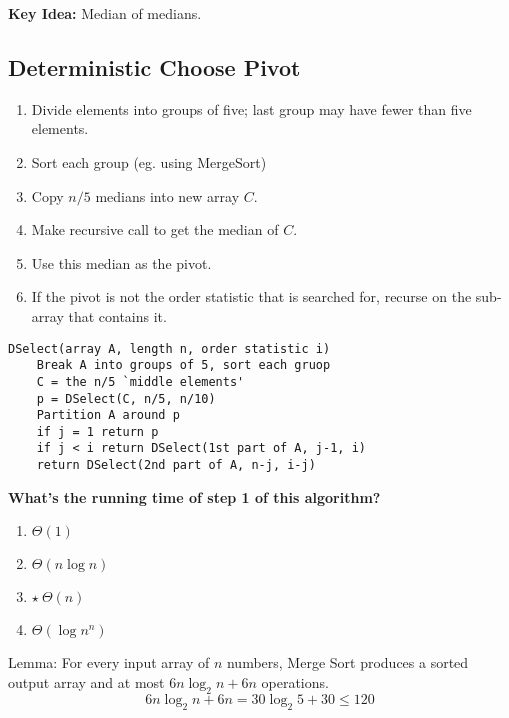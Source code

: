 \documentclass{article}
\begin{document}
\textbf{Key Idea:} Median of medians.

\subsection*{Deterministic Choose Pivot}
\begin{enumerate}
    \item Divide elements into groups of five; last group may have fewer than five elements.
    \item Sort each group (eg. using MergeSort)
    \item Copy \(n/5\) medians into new array $C$.
    \item Make recursive call to get the median of $C$.
    \item Use this median as the pivot.
    \item If the pivot is not the order statistic that is searched for, recurse on the sub-array that contains it.
\end{enumerate}

\begin{verbatim}
DSelect(array A, length n, order statistic i)
    Break A into groups of 5, sort each gruop
    C = the n/5 `middle elements'
    p = DSelect(C, n/5, n/10)
    Partition A around p
    if j = 1 return p
    if j < i return DSelect(1st part of A, j-1, i)
    return DSelect(2nd part of A, n-j, i-j)
\end{verbatim}

\textbf{What's the running time of step 1 of this algorithm?}
\begin{enumerate}
    \item \(\Theta(1)\)
    \item \(\Theta(n \log n)\)
    \item \(\star\ \Theta(n)\)
    \item  \(\Theta(\log n^n)\)
\end{enumerate}

Lemma: For every input array of $n$ numbers, Merge Sort produces a sorted output array and at most \(6n \log_2 n + 6n\) operations.
\begin{equation*}
    6n \log_2 n + 6n = 30 \log_2 5 + 30 \leq 120
\end{equation*}
\end{document}

